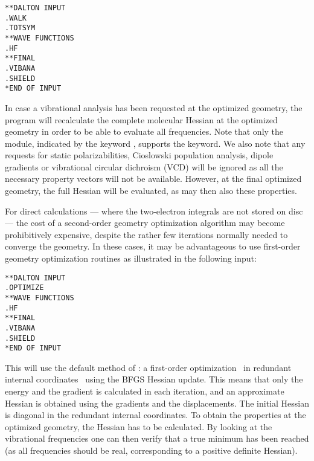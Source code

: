 \begin{verbatim}
**DALTON INPUT
.WALK
.TOTSYM
**WAVE FUNCTIONS
.HF
**FINAL
.VIBANA
.SHIELD
*END OF INPUT
\end{verbatim}

In case a vibrational analysis has been requested at the optimized
geometry, the program will recalculate the complete molecular Hessian
at the optimized geometry in order to be able to evaluate all
frequencies. Note that only the  module, indicated by the
keyword , supports the  keyword.
We also note that any requests for static
polarizabilities, Cioslowski population
analysis, dipole gradients or vibrational circular dichroism (VCD) will be ignored as all the necessary
property vectors will not be available. However, at the final
optimized geometry, the full Hessian will be evaluated, as may then
also these properties.

For direct calculations --- where the
two-electron integrals are not stored on disc --- the cost of a
second-order geometry optimization algorithm may become
prohibitively expensive, despite the rather few iterations normally
needed to converge the geometry. In these cases, it may be
advantageous to use first-order geometry
optimization routines as
illustrated in the following input:

\begin{verbatim}
**DALTON INPUT
.OPTIMIZE
**WAVE FUNCTIONS
.HF
**FINAL
.VIBANA
.SHIELD
*END OF INPUT
\end{verbatim}

This will use the default method of : a first-order
optimization~\cite{Fletcher} in redundant internal
coordinates~\cite{gfxfzpwtppjacs114,ppgfjcp96,vbth} using the BFGS
Hessian update. This means that
only the energy and the gradient is calculated in each iteration, and
an approximate Hessian is obtained using the gradients and the
displacements. The initial Hessian is diagonal in the redundant
internal coordinates. To obtain the properties at the optimized
geometry, the Hessian has to be calculated. By looking at the
vibrational frequencies one can then verify that a true minimum has
been reached (as all frequencies should be real, corresponding to a
positive definite Hessian).

